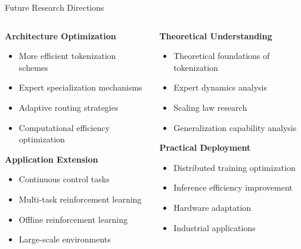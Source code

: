 \documentclass{beamer}
\begin{document}
\begin{frame}{Future Research Directions}
  \begin{columns}[T]
    \begin{column}{0.5\textwidth}
      \textbf{Architecture Optimization}
      \begin{itemize}
        \item More efficient tokenization schemes
        \item Expert specialization mechanisms
        \item Adaptive routing strategies
        \item Computational efficiency optimization
      \end{itemize}
      
      \textbf{Application Extension}
      \begin{itemize}
        \item Continuous control tasks
        \item Multi-task reinforcement learning
        \item Offline reinforcement learning
        \item Large-scale environments
      \end{itemize}
    \end{column}
    \begin{column}{0.5\textwidth}
      \textbf{Theoretical Understanding}
      \begin{itemize}
        \item Theoretical foundations of tokenization
        \item Expert dynamics analysis
        \item Scaling law research
        \item Generalization capability analysis
      \end{itemize}
      
      \textbf{Practical Deployment}
      \begin{itemize}
        \item Distributed training optimization
        \item Inference efficiency improvement
        \item Hardware adaptation
        \item Industrial applications
      \end{itemize}
    \end{column}
  \end{columns}
\end{frame}
\end{document}
